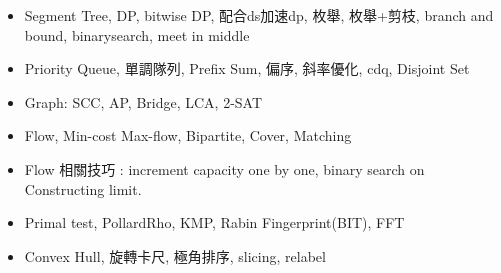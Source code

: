 \begin{itemize}
	\setlength\itemsep{-0.5em}
	\item Segment Tree, DP, bitwise DP, 配合ds加速dp, 枚舉, 枚舉+剪枝, branch and bound, binarysearch, meet in middle
	\item Priority Queue, 單調隊列, Prefix Sum, 偏序, 斜率優化, cdq, Disjoint Set
	\item Graph: SCC, AP, Bridge, LCA, 2-SAT
	\item Flow, Min-cost Max-flow, Bipartite, Cover, Matching
	\item Flow 相關技巧 : increment capacity one by one, binary search on Constructing limit. 
	\item Primal test, PollardRho, KMP, Rabin Fingerprint(BIT), FFT
	\item Convex Hull, 旋轉卡尺, 極角排序, slicing, relabel
\end{itemize}
